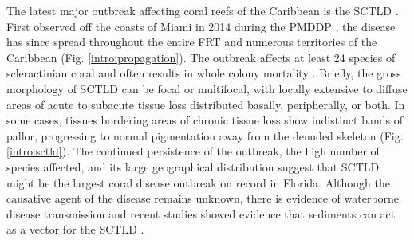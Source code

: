 The latest major outbreak affecting coral reefs of the Caribbean is the SCTLD \citep{noaa2018}. First observed off the coasts of Miami in 2014 during the PMDDP \citep{precht2016unprecedented}, the disease has since spread throughout the entire FRT and numerous territories of the Caribbean \citep{alvarez2019rapid, kramer2019map, estrada2021effects} (Fig. \ref{intro:propagation}). The outbreak affects at least 24 species of scleractinian coral and often results in whole colony mortality \citep{precht2016unprecedented, walton2018impacts}. Briefly, the gross morphology of SCTLD can be focal or multifocal, with locally extensive to diffuse areas of acute to subacute tissue loss distributed basally, peripherally, or both. In some cases, tissues bordering areas of chronic tissue loss show indistinct bands of pallor, progressing to normal pigmentation away from the denuded skeleton (Fig. \ref{intro:sctld}). The continued persistence of the outbreak, the high number of species affected, and its large geographical distribution suggest that SCTLD might be the largest coral disease outbreak on record in Florida. Although the causative agent of the disease remains unknown, there is evidence of waterborne disease transmission \citep{aeby2019pathogenesis,eaton2021measuring,meiling2021variable} and recent studies showed evidence that sediments can act as a vector for the SCTLD \citep{rosales2020rhodobacterales, studivan2022reef}. 

